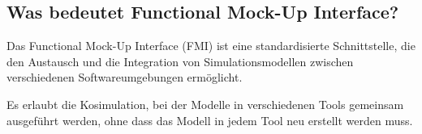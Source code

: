\subsection{Was bedeutet Functional Mock-Up Interface?}
Das Functional Mock-Up Interface (FMI) ist eine standardisierte Schnittstelle, die den Austausch und die Integration von Simulationsmodellen zwischen verschiedenen Softwareumgebungen ermöglicht. 

Es erlaubt die Kosimulation, bei der Modelle in verschiedenen Tools gemeinsam ausgeführt werden, ohne dass das Modell in jedem Tool neu erstellt werden muss.